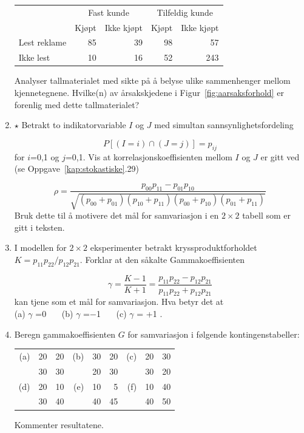 \begin{enumerate}
\begin{center}
\begin{tabular}{l|rr|rr}
    &\multicolumn{2}{c|}{Fast kunde}&\multicolumn{2}{c}{Tilfeldig kunde}  \\
             & Kjøpt & Ikke kjøpt & Kjøpt & Ikke kjøpt  \\ \hline
Lest reklame &    85    &       39      &    98    &       57       \\
Ikke lest    &    10    &       16      &    52    &      243       \\ \hline
\end{tabular}
\end{center}

Analyser tallmaterialet med sikte på å belyse ulike sammenhenger
mellom kjennetegnene.  Hvilke(n) av årsakskjedene i Figur~\ref{fig:aarsaksforhold} er
forenlig med dette tallmaterialet?

\item
$\star$ Betrakt to indikatorvariable $I$ og $J$ med simultan 
sannsynlighetsfordeling

\[ P[(I=i)\cap (J=j)]=p_{ij}  \]
for $i$=0,1 og $j$=0,1.  Vis at korrelasjonskoeffisienten mellom $I$ 
og $J$ er gitt ved (se Oppgave~\ref*{kap:stokastiske}.29)

\[ \rho =\frac{p_{00}p_{11}-p_{01}p_{10}}
    {\sqrt{(p_{00}+p_{01})(p_{10}+p_{11})(p_{00}+p_{10})(p_{01}+p_{11})}} \]
Bruk dette til å motivere det mål for samvariasjon i en
$2\times 2$ tabell som er gitt i teksten.

\item
I modellen for $2\times 2$ eksperimenter betrakt kryssproduktforholdet
$K = p_{11}p_{22}/ p_{12}p_{21}$.  Forklar at den såkalte 
Gammakoeffisienten

\[ \gamma =\frac{K-1}{K+1}=
            \frac{p_{11}p_{22}-p_{12}p_{21}}{p_{11}p_{22}+p_{12}p_{21}} \]
kan tjene som et mål for samvariasjon. Hva betyr det at \\
(a) $\gamma$ =0 \ \ \      (b) $\gamma$ =$-$1 \ \ \   (c) $\gamma$ = +1 .

\item
Beregn gammakoeffisienten $G$ for samvariasjon i følgende 
kontingenstabeller:
\begin{center}
\begin{tabular}{|rrr|rrr|rrr|} \hline
(a)&20&20&(b)&30&20&(c)&20&30\\ 
   &30&30&   &20&30&   &30&20\\ \hline
(d)&20&10&(e)&10& 5&(f)&10&40\\
   &30&40&   &40&45&   &40&50\\ \hline
\end{tabular}
\end{center}
Kommenter resultatene.


\end{enumerate}
